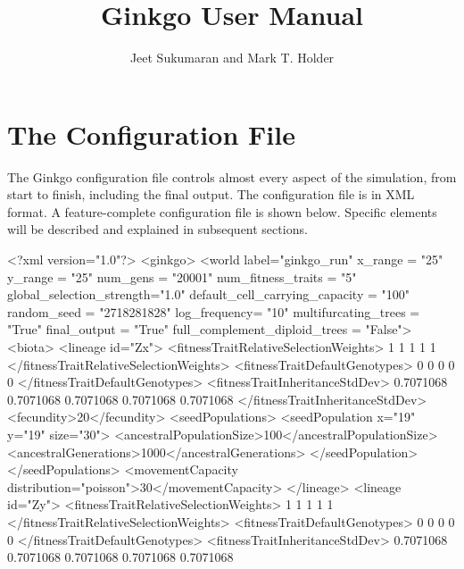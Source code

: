 \documentclass[11pt]{article}
\title{Ginkgo User Manual}
\author{Jeet Sukumaran and Mark T. Holder}
\date{}                                           %
\begin{document}
\maketitle

\part{The Configuration File}

The Ginkgo configuration file controls almost every aspect of the simulation, from start to finish, including the final output.
The configuration file is in XML format.
A feature-complete configuration file is shown below.
Specific elements will be described and explained in subsequent sections.
\begin{ginkgoxml}
<?xml version="1.0"?>
<ginkgo>
    <world label="ginkgo_run"
           x_range = "25"
           y_range = "25"
           num_gens = "20001"
           num_fitness_traits = "5"
           global_selection_strength="1.0"
           default_cell_carrying_capacity = "100"
           random_seed = "2718281828"
           log_frequency= "10"
           multifurcating_trees = "True"
           final_output = "True"
           full_complement_diploid_trees = "False">
        <biota>
            <lineage id="Zx">
                <fitnessTraitRelativeSelectionWeights>
                	1 1 1 1 1
                </fitnessTraitRelativeSelectionWeights>
                <fitnessTraitDefaultGenotypes>
                	0 0 0 0 0
                </fitnessTraitDefaultGenotypes>
                <fitnessTraitInheritanceStdDev>
                	0.7071068 0.7071068 0.7071068 0.7071068 0.7071068
                </fitnessTraitInheritanceStdDev>
                <fecundity>20</fecundity>
                <seedPopulations>
                    <seedPopulation x="19" y="19" size="30">
                        <ancestralPopulationSize>100</ancestralPopulationSize>
                        <ancestralGenerations>1000</ancestralGenerations>
                    </seedPopulation>
                </seedPopulations>
                <movementCapacity distribution="poisson">30</movementCapacity>
            </lineage>
            <lineage id="Zy">
                <fitnessTraitRelativeSelectionWeights>
                	1 1 1 1 1
                </fitnessTraitRelativeSelectionWeights>
                <fitnessTraitDefaultGenotypes>
                	0 0 0 0 0
                </fitnessTraitDefaultGenotypes>
                <fitnessTraitInheritanceStdDev>
                	0.7071068 0.7071068 0.7071068 0.7071068 0.7071068

\end{ginkgoxml}
\end{document}
